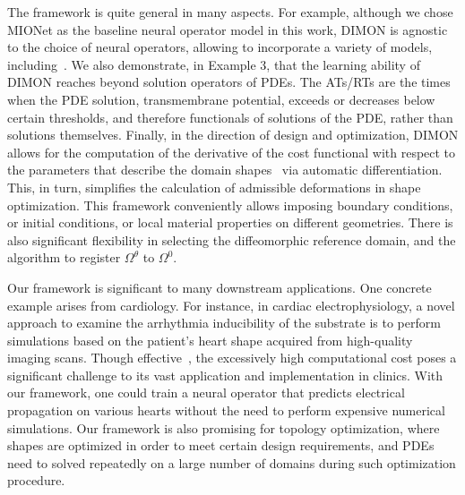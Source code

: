 \documentclass[review]{elsarticle}
\def\Omegatheta{{\Omega^\theta}}
\def\refd{0}
\def\Omegaref{{\Omega^\refd}}
\begin{document}
The framework is quite general in many aspects. For example, although we chose MIONet as the baseline neural operator model in this work, DIMON is agnostic to the choice of neural operators, allowing to incorporate a variety of models, including~\cite{li2020fourier,lu2022multifidelity,cao2023lno,hao2023gnot}. We also demonstrate, in Example 3, that the learning ability of DIMON reaches beyond solution operators of PDEs. The ATs/RTs are the times when the PDE solution, transmembrane potential, exceeds or decreases below certain thresholds, and therefore functionals of solutions of the PDE, rather than solutions themselves. Finally, in the direction of design and optimization, DIMON allows for the computation of the derivative of the cost functional with respect to the parameters that describe the domain shapes~\cite{shukla2023deep} via automatic differentiation. This, in turn, simplifies the calculation of admissible deformations in shape optimization.
This framework conveniently allows imposing boundary conditions, or initial conditions, or local material properties on different geometries. There is also significant flexibility in selecting the diffeomorphic reference domain, and the algorithm to register $\Omegatheta$ to $\Omegaref$.


Our framework is significant to many downstream applications. One concrete example arises from cardiology. For instance, in cardiac electrophysiology, a novel approach to examine the arrhythmia inducibility of the substrate is to perform simulations based on the patient's heart shape acquired from high-quality imaging scans. Though effective~\cite{prakosa2018personalized}, the excessively high computational cost poses a significant challenge to its vast application and implementation in clinics. With our framework, one could train a neural operator that predicts electrical propagation on various hearts without the need to perform expensive numerical simulations. Our framework is also promising for topology optimization, where shapes are optimized in order to meet certain design requirements, and PDEs need to solved repeatedly on a large number of domains during such optimization procedure.
\end{document}
